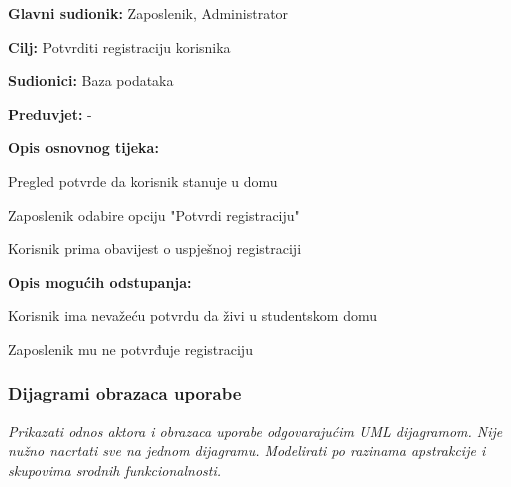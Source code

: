 \begin{packed_item}
	
	\item \textbf{Glavni sudionik: }Zaposlenik, Administrator
	\item  \textbf{Cilj:} Potvrditi registraciju korisnika
	\item  \textbf{Sudionici:} Baza podataka
	\item  \textbf{Preduvjet:} -
	\item  \textbf{Opis osnovnog tijeka:}
	
	\item[] \begin{packed_enum}
		
		\item Pregled potvrde da korisnik stanuje u domu
		\item Zaposlenik odabire opciju "Potvrdi registraciju"
		\item Korisnik prima obavijest o uspješnoj registraciji
		
	\end{packed_enum}
	\item  \textbf{Opis mogućih odstupanja:}
	
	\item[] \begin{packed_item}
		
		\item[1.a] Korisnik ima nevažeću potvrdu da živi u studentskom   domu 
		\item[] \begin{packed_enum}
			
			\item Zaposlenik mu ne potvrđuje registraciju
			
		\end{packed_enum}
		
		
	\end{packed_item}
\end{packed_item}

\subsubsection{Dijagrami obrazaca uporabe}

\textit{Prikazati odnos aktora i obrazaca uporabe odgovarajućim UML dijagramom. Nije nužno nacrtati sve na jednom dijagramu. Modelirati po razinama apstrakcije i skupovima srodnih funkcionalnosti.}
\eject		

